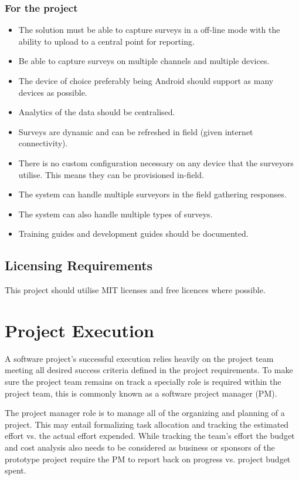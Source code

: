 \documentclass[12pt]{witseiepaper}
\begin{document}
\subsubsection{For the project}
\begin{itemize}
  \item The solution must be able to capture surveys in a off-line mode with the ability to upload to a central point for reporting.
  \item Be able to capture surveys on multiple channels and multiple devices.
  \item The device of choice preferably being Android should support as many devices as possible.
  \item Analytics of the data should be centralised.
  \item Surveys are dynamic and can be refreshed in field (given internet connectivity).
  \item There is no custom configuration necessary on any device that the surveyors utilise. This means they can be provisioned in-field.
  \item The system can handle multiple surveyors in the field gathering responses.
  \item The system can also handle multiple types of surveys.
  \item Training guides and development guides should be documented.
\end{itemize}

\subsection{Licensing Requirements}
This project should utilise MIT licenses and free licences where possible.

\section{Project Execution}
A software project's successful execution relies heavily on the project team meeting all desired success criteria defined in the project requirements. To make sure the project team remains on track a specially role is required within the project team, this is commonly known as a software project manager (PM). \cite{SPM}

The project manager role is to manage all of the organizing and planning of a project. This may entail formalizing task allocation and tracking the estimated effort vs. the actual effort expended.
While tracking the team’s effort the budget and cost analysis also needs to be considered as business or sponsors of the prototype project require the PM to report back on progress vs. project budget spent. \cite{ExpertJudgement}
\end{document}

